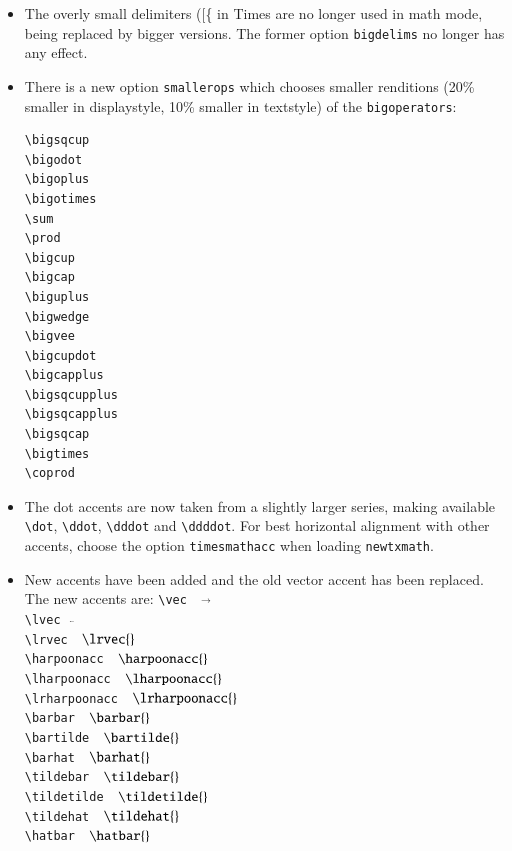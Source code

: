 \documentclass[\fsc]{article}
\theoremstyle{oldplain}
\theoremstyle{plain}
\begin{document}
\begin{itemize}
\begin{center}
\begin{tabular}{@{} llll @{}}
$\smallvarointclockwise$  & \verb|$\smallvarointclockwise$|& $\varointclockwise$, $\displaystyle{\varointclockwise}$& \verb|$\varointclockwise$|\\ 
$\smallointctrclockwise$  & \verb|$\smallointctrclockwise$|& $\ointctrclockwise$, $\displaystyle{\ointctrclockwise}$& \verb|$\ointctrclockwise$|\\ 
    \bottomrule
  \end{tabular}
\end{center}
\item  The overly small delimiters ([\{ in Times are no longer used in math mode, being replaced by bigger versions. The former option {\tt bigdelims} no longer has any effect.
\item There is a new option {\tt smallerops} which chooses smaller renditions (20\% smaller in displaystyle, 10\% smaller in textstyle) of the {\tt bigoperators}:
\begin{verbatim}
\bigsqcup
\bigodot
\bigoplus
\bigotimes
\sum
\prod
\bigcup
\bigcap
\biguplus
\bigwedge
\bigvee
\bigcupdot
\bigcapplus
\bigsqcupplus
\bigsqcapplus
\bigsqcap
\bigtimes
\coprod
\end{verbatim}
\item The dot accents are now taken from a slightly larger series, making available \verb|\dot|, \verb|\ddot|, \verb|\dddot| and \verb|\ddddot|. For best horizontal alignment with other accents, choose the option {\tt timesmathacc} when loading {\tt newtxmath}.
\item New accents have been added and the old vector accent has been replaced. The new accents are:
\verb|\vec|$\quad\vec{}$\\
\verb|\lvec|$\quad\lvec{}$\\
\verb|\lrvec|$\quad\lrvec{}$\\
\verb|\harpoonacc|$\quad\harpoonacc{}$\\
\verb|\lharpoonacc|$\quad\lharpoonacc{}$\\
\verb|\lrharpoonacc|$\quad\lrharpoonacc{}$\\
\verb|\barbar|$\quad\barbar{}$\\
\verb|\bartilde|$\quad\bartilde{}$\\
\verb|\barhat|$\quad\barhat{}$\\
\verb|\tildebar|$\quad\tildebar{}$\\
\verb|\tildetilde|$\quad\tildetilde{}$\\
\verb|\tildehat|$\quad\tildehat{}$\\
\verb|\hatbar|$\quad\hatbar{}$\\

\end{itemize}
\end{document}
